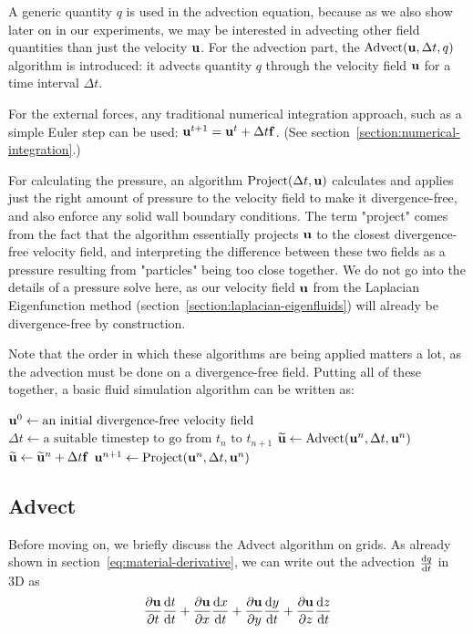 A generic quantity $q$ is used in the advection equation, because as we also
show later on in our experiments, we may be interested in advecting other field
quantities than just the velocity $\vb{u}$. For the advection part, the
$\text{Advect}(\vb{u}, \Delta t, q)$ algorithm is introduced: it advects
quantity $q$ through the velocity field $\vb{u}$ for a time interval $\Delta t$. 

For the external forces, any traditional numerical integration approach, such as
a simple Euler step can be used: $\vb{u}^{t+1} = \vb{u}^t + \Delta t \vb{f}$.
(See section~\ref{section:numerical-integration}.)

For calculating the pressure, an algorithm $\text{Project}(\Delta t, \vb{u})$
calculates and applies just the right amount of pressure to the velocity field
to make it divergence-free, and also enforce any solid wall boundary
conditions. The term "project" comes from the fact that the algorithm
essentially projects $\vb{u}$ to the closest divergence-free velocity field, and
interpreting the difference between these two fields as a pressure resulting
from "particles" being too close together. We do not go into the details of a
pressure solve here, as our velocity field $\vb{u}$ from the Laplacian
Eigenfunction method (section~\ref{section:laplacian-eigenfluids}) will already
be divergence-free by construction. 

Note that the order in which these algorithms are being applied matters a lot,
as the advection must be done on a divergence-free field. Putting all of these
together, a basic fluid simulation algorithm can be written as:

\begin{algorithmic}
    \State $\vb{u}^0 \gets \text{an initial divergence-free velocity field}$
        \State $\Delta t 
            \gets \text{a suitable timestep to go from $t_n$ to $t_{n+1}$}$
        \State $\widetilde{\vb{u}} 
            \gets \text{Advect}(\vb{u}^n,\Delta t, \vb{u}^n)$
        \State $\widetilde{\vb{u}} 
            \gets \widetilde{\vb{u}}^n + \Delta t \vb{f}$
        \State $\vb{u}^{n+1}
            \gets \text{Project}(\vb{u}^n,\Delta t, \vb{u}^n)$
            \EndFor {}
\end{algorithmic}

\subsection*{Advect}
Before moving on, we briefly discuss the Advect algorithm on grids. As already
shown in section~\ref{eq:material-derivative}, we can write out the advection 
$\dv{q}{t}$ in 3D as
$$\pdv{\vb{u}}{t}\dv{t}{t} 
                    + \pdv{\vb{u}}{x}\dv{x}{t} 
                    + \pdv{\vb{u}}{y}\dv{y}{t} 
                    + \pdv{\vb{u}}{z}\dv{z}{t}$$

